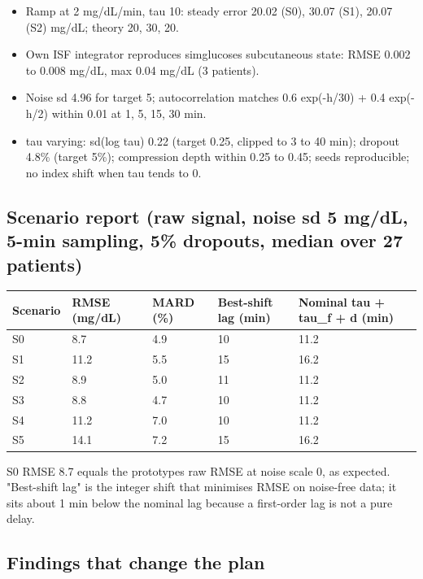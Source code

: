 \documentclass[11pt,a4paper]{article}
\providecommand{\tightlist}{\setlength{\itemsep}{0pt}\setlength{\parskip}{0pt}}
\begin{document}
\begin{itemize}
\tightlist
\item
  Ramp at 2 mg/dL/min, tau 10: steady error 20.02 (S0), 30.07 (S1),
  20.07 (S2) mg/dL; theory 20, 30, 20.
\item
  Own ISF integrator reproduces simglucose\textquotesingle s
  subcutaneous state: RMSE 0.002 to 0.008 mg/dL, max 0.04 mg/dL (3
  patients).
\item
  Noise sd 4.96 for target 5; autocorrelation matches 0.6 exp(-h/30) +
  0.4 exp(-h/2) within 0.01 at 1, 5, 15, 30 min.
\item
  tau varying: sd(log tau) 0.22 (target 0.25, clipped to 3 to 40 min);
  dropout 4.8\% (target 5\%); compression depth within 0.25 to 0.45;
  seeds reproducible; no index shift when tau tends to 0.
\end{itemize}

\hypertarget{scenario-report-raw-signal-noise-sd-5-mgdl-5-min-sampling-5-dropouts-median-over-27-patients}{%
\subsection{Scenario report (raw signal, noise sd 5 mg/dL, 5-min
sampling, 5\% dropouts, median over 27
patients)}\label{scenario-report-raw-signal-noise-sd-5-mgdl-5-min-sampling-5-dropouts-median-over-27-patients}}

\begin{longtable}[]{@{}lllll@{}}
\toprule\noalign{}
Scenario & RMSE (mg/dL) & MARD (\%) & Best-shift lag (min) & Nominal tau
+ tau\_f + d (min) \\
\midrule\noalign{}
\endhead
\bottomrule\noalign{}
\endlastfoot
S0 & 8.7 & 4.9 & 10 & 11.2 \\
S1 & 11.2 & 5.5 & 15 & 16.2 \\
S2 & 8.9 & 5.0 & 11 & 11.2 \\
S3 & 8.8 & 4.7 & 10 & 11.2 \\
S4 & 11.2 & 7.0 & 10 & 11.2 \\
S5 & 14.1 & 7.2 & 15 & 16.2 \\
\end{longtable}

S0 RMSE 8.7 equals the prototype\textquotesingle s raw RMSE at noise
scale 0, as expected. "Best-shift lag" is the integer shift that
minimises RMSE on noise-free data; it sits about 1 min below the nominal
lag because a first-order lag is not a pure delay.

\hypertarget{findings-that-change-the-plan}{%
\subsection{Findings that change the
plan}\label{findings-that-change-the-plan}}
\end{document}
